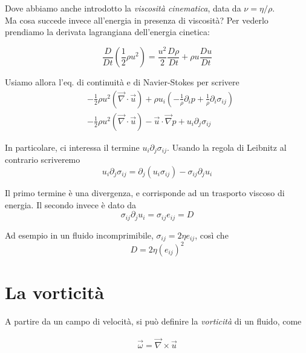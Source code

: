 \documentclass{report}
\begin{document}
Dove abbiamo anche introdotto la \emph{viscosità cinematica}, data da $\nu = \eta / \rho$. \\

Ma cosa succede invece all'energia in presenza di viscosità? Per vederlo prendiamo la derivata lagrangiana dell'energia cinetica: 

\begin{equation}
    \frac{D}{Dt}\left(\frac{1}{2}\rho u^2 \right) = \frac{u^2}{2}\frac{D\rho}{Dt} + \rho u \frac{Du}{Dt}
\end{equation}

Usiamo allora l'eq. di continuità e di Navier-Stokes per scrivere 
\begin{align}
    &-\frac{1}{2}\rho u^2 (\vec{\nabla}\cdot \vec{u}) + \rho u_i \left(-\frac{1}{\rho}\partial_i p + \frac{1}{\rho}\partial_i \sigma_{ij} \right) \\
    & -\frac{1}{2}\rho u^2 (\vec{\nabla}\cdot \vec{u}) - \vec{u}\cdot \vec{\nabla}p + u_i\partial_j \sigma_{ij}
\end{align}


In particolare, ci interessa il termine $u_i\partial_j \sigma_{ij}$. Usando la regola di Leibnitz al contrario scriveremo 
\begin{equation}
    u_i\partial_j \sigma_{ij} = \partial_j(u_i\sigma_{ij}) - \sigma_{ij}\partial_ju_i
\end{equation}

Il primo termine è una divergenza, e corrisponde ad un trasporto viscoso di energia. Il secondo invece è dato da 
\begin{equation}
    \sigma_{ij}\partial_ju_i = \sigma_{ij}e_{ij} = D
\end{equation}

Ad esempio in un fluido incomprimibile, $\sigma_{ij} = 2\eta e_{ij}$, così che 
\begin{equation}
    D = 2\eta (e_{ij})^2
\end{equation}

\section{La vorticità}

A partire da un campo di velocità, si può definire la \emph{vorticità} di un fluido, come 

\begin{align}
    \vec{\omega} = \vec{\nabla}\times \vec{u}
\end{align}
\end{document}
